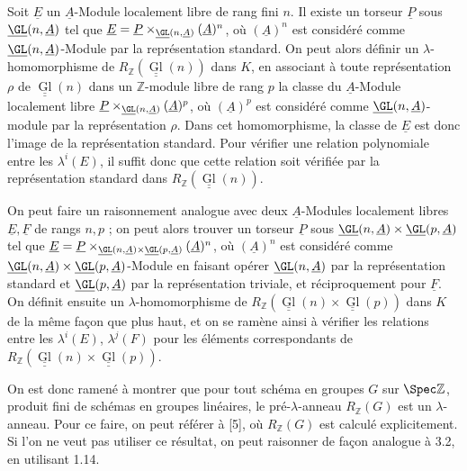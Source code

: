 
Soit \(\underline{E}\) un \(\underline{A}\)-Module localement libre de rang fini \(n\). Il existe un torseur \(\underline{P}\) sous \(\underline{\GL}(n,\underline{A})\) tel que \(\underline{E}=\underline{P}\times_{\underline{\GL}(n,\underline{A})} (\underline{A})^n\), où \((\underline{A})^n\) est considéré comme \(\underline{\GL}(n,\underline{A})\)-Module par la représentation standard. On peut alors définir un \(\lambda\)-homomorphisme de \(R_{\mathbb Z}(\underline{\underline{\operatorname{Gl}}}(n))\) dans \(K\), en associant à toute représentation \(\rho\) de \(\underline{\underline{\operatorname{Gl}}}(n)\) dans un \(\mathbb Z\)-module libre de rang \(p\) la classe du \(\underline{A}\)-Module localement libre
\(\underline{P}\times_{\underline{\GL}(n,\underline{A})} (\underline{A})^p\), où \((\underline{A})^p\) est considéré comme \(\underline{\GL}(n,\underline{A})\)-module par la représentation \(\rho\). Dans cet homomorphisme, la classe de \(\underline{E}\) est donc l'image de la représentation standard. Pour vérifier une relation polynomiale entre les \(\lambda^i(E)\), il suffit donc que cette relation soit vérifiée par la représentation standard dans \(R_{\mathbb Z}(\underline{\underline{\operatorname{Gl}}}(n))\).

On peut faire un raisonnement analogue avec deux \(\underline{A}\)-Modules localement libres \(\underline{E},\underline{F}\) de rangs \(n,p\) ; on peut alors trouver un torseur \(\underline{P}\) sous \(\underline{\GL}(n,\underline{A})\times\underline{\GL}(p,\underline{A})\) tel que \(\underline{E}=\underline{P}\times_{\underline{\GL}(n,\underline{A})\times\underline{\GL}(p,\underline{A})} (\underline{A})^n\), où \((\underline{A})^n\) est considéré comme \(\underline{\GL}(n,\underline{A})\times\underline{\GL}(p,\underline{A})\)-Module en faisant opérer \(\underline{\GL}(n,\underline{A})\) par la représentation standard et \(\underline{\GL}(p,\underline{A})\) par la représentation triviale, et réciproquement pour \(\underline{F}\). On définit ensuite un \(\lambda\)-homomorphisme de \(R_{\mathbb Z}(\underline{\underline{\operatorname{Gl}}}(n)\times\underline{\underline{\operatorname{Gl}}}(p))\) dans \(K\) de la même façon que plus haut, et on se ramène ainsi à vérifier les relations entre les \(\lambda^i(E)\), \(\lambda^j(F)\) pour les éléments correspondants de \(R_{\mathbb Z}(\underline{\underline{\operatorname{Gl}}}(n)\times\underline{\underline{\operatorname{Gl}}}(p))\).

On est donc ramené à montrer que pour tout schéma en groupes \(G\) sur \(\Spec\mathbb Z\), produit fini de schémas en groupes linéaires, le pré-\(\lambda\)-anneau \(R_{\mathbb Z}(G)\) est un \(\lambda\)-anneau. Pour ce faire, on peut référer à [5], où \(R_{\mathbb Z}(G)\) est calculé explicitement. Si l'on ne veut pas utiliser ce résultat, on peut raisonner de façon analogue à 3.2, en utilisant 1.14.

